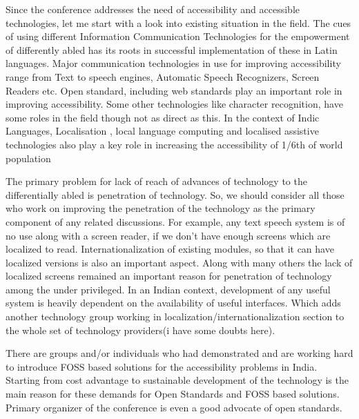 ﻿
\vskip 2pt


Since the conference addresses the need of accessibility and accessible technologies, let me start with a look into existing situation in the field. The cues of using different Information Communication Technologies for the empowerment of differently abled has its roots in successful implementation of these in Latin languages. Major communication technologies in use for improving accessibility range from Text to speech engines, Automatic Speech Recognizers, Screen Readers etc. Open standard, including web standards play an important role in improving accessibility. Some other technologies like character recognition, have some roles in the field though not as direct as this. In the context of Indic Languages, Localisation , local language computing and localised assistive technologies also play a key role in increasing the accessibility of 1/6th of world population

The primary problem for lack of reach of advances of technology to the differentially abled is penetration of technology. So, we should consider all those who work on improving the penetration of the technology as the primary component of any related discussions. For example, any text speech system is of no use along with a screen reader, if we don't have enough screens which are localized to read. Internationalization of existing modules, so that it can have localized versions is also an important aspect. Along with many others the lack of localized screens remained an important reason for penetration of technology among the under privileged. In an Indian context, development of any useful system is heavily dependent on the availability of useful interfaces. Which adds another technology group working in localization/internationalization section to the whole set of technology providers(i have some doubts here). 

There are groups and/or individuals who had demonstrated and are working hard to introduce FOSS based solutions for the accessibility problems in India. Starting from cost advantage to sustainable development of the technology is the main reason for these demands for Open Standards and FOSS based solutions. Primary organizer of the conference is even a good advocate of open standards. 

